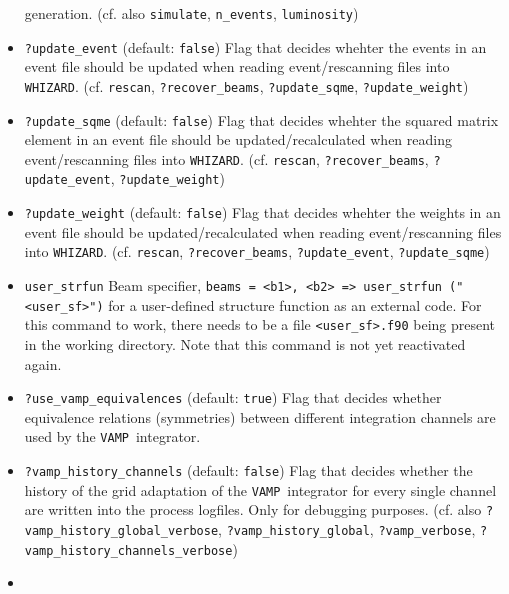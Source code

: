 \documentclass[12pt]{book}
\newcommand{\ttt}[1]{\texttt{#1}}
\newcommand{\whizard}{\texttt{WHIZARD}}
\newcommand{\vamp}{\texttt{VAMP}}
\begin{document}
\begin{itemize}
generation. (cf. also \ttt{simulate}, \ttt{n\_events},
\ttt{luminosity}) 
\item
\ttt{?update\_event} \qquad (default: \ttt{false}) \newline
Flag that decides whehter the events in an event file should be
updated when reading event/rescanning files into
\whizard. (cf. \ttt{rescan}, \ttt{?recover\_beams},
\ttt{?update\_sqme}, \ttt{?update\_weight}) 
\item
\ttt{?update\_sqme} \qquad (default: \ttt{false}) \newline
Flag that decides whehter the squared matrix element in an event file
should be updated/recalculated when reading event/rescanning files
into \whizard. (cf. \ttt{rescan}, \newline \ttt{?recover\_beams},
\ttt{?update\_event}, \ttt{?update\_weight}) 
\item
\ttt{?update\_weight} \qquad (default: \ttt{false}) \newline
Flag that decides whehter the weights in an event file
should be updated/recalculated when reading event/rescanning files
into \whizard. (cf. \ttt{rescan}, \ttt{?recover\_beams},
\newline \ttt{?update\_event}, \ttt{?update\_sqme}) 
\item
{\color{red}
\ttt{user\_strfun} \newline
Beam specifier, \ttt{beams = <b1>, <b2> => user\_strfun ("<user\_sf>")}
for a user-defined structure function as an external code. For this
command to work, there needs to be a file \ttt{<user\_sf>.f90} being
present in the working directory. Note that this command is not yet
reactivated again. 
}
\item
\ttt{?use\_vamp\_equivalences} \qquad (default: \ttt{true}) \newline
Flag that decides whether equivalence relations (symmetries) between
different integration channels are used by the \vamp\ integrator. 
\item
\ttt{?vamp\_history\_channels} \qquad (default: \ttt{false}) \newline
Flag that decides whether the history of the grid adaptation of
the \vamp\ integrator for every single channel are written into the
process logfiles. Only for debugging purposes.
(cf. also \ttt{?vamp\_history\_global\_verbose},
\ttt{?vamp\_history\_global}, \ttt{?vamp\_verbose},
\newline \ttt{?vamp\_history\_channels\_verbose}) 
\item

\end{itemize}
\end{document}
